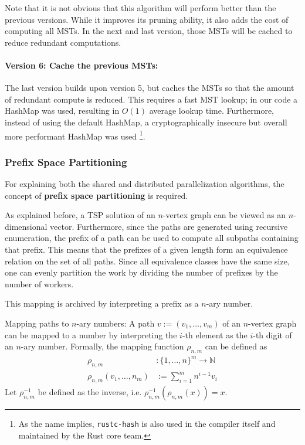 Note that it is not obvious that this algorithm will perform better than the previous versions. While it improves its pruning ability, it also adds the cost of computing all \acp{MST}. In the next and last version, those \acp{MST} will be cached to reduce redundant computations.

\paragraph{Version 6: Cache the previous \acp{MST}:}
The last version builds upon version 5, but caches the \acp{MST} so that the amount of redundant compute is reduced. This requires a fast \ac{MST} lookup; in our code a HashMap was used, resulting in $O(1)$ average lookup time. Furthermore, instead of using the default HashMap, a cryptographically insecure but overall more performant HashMap was used \cite{noauthor_rustc-hash_2023}\footnote{As the name implies, \texttt{rustc-hash} is also used in the compiler itself and maintained by the Rust core team.}.

\subsubsection{Prefix Space Partitioning}

For explaining both the shared and distributed parallelization algorithms, the concept of \textbf{prefix space partitioning} is required.

As explained before, a \ac{TSP} solution of an $n$-vertex graph can be viewed as an $n$-dimensional vector. Furthermore, since the paths are generated using recursive enumeration, the prefix of a path can be used to compute all subpaths containing that prefix. This means that the prefixes of a given length form an equivalence relation on the set of all paths. Since all equivalence classes have the same size, one can evenly partition the work by dividing the number of prefixes by the number of workers.

This mapping is archived by interpreting a prefix as a $n$-ary number.

\begin{definition}{Mapping paths to $n$-ary numbers:}
A path $v :=(v_1,\dots,v_m)$ of an $n$-vertex graph can be mapped to a number by interpreting the $i$-th element as the $i$-th digit of an $n$-ary number.
Formally, the mapping function $\rho_{n,m}$ can be defined as
\begin{align*}
    \rho_{n,m} &: \{1,\dots,n\}^m \rightarrow \mathbb{N}\\
    \rho_{n,m}(v_1,\dots,n_m) &:= \sum_{i=1}^m n^{i-1} v_{i}
\end{align*}
Let $\rho_{n,m}^{-1}$ be defined as the inverse, i.e. $\rho_{n,m}^{-1}(\rho_{n,m}(x)) = x$.
\end{definition}

